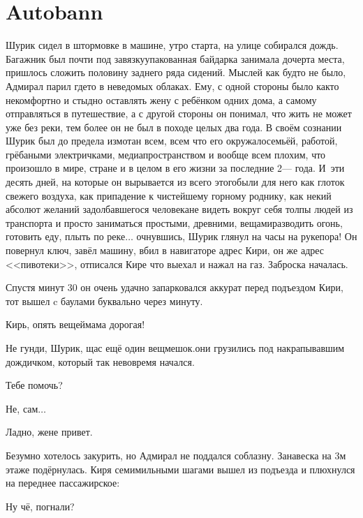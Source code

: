 \chapter{Autobann}
\vepsianrose

Шурик сидел в штормовке в машине, утро старта, на улице собирался дождь. Багажник был почти под завязку\mdash упакованная байдарка занимала дочерта места, пришлось сложить половину заднего ряда сидений. Мыслей как будто не было, Адмирал парил где\sdash то в неведомых облаках. Ему, с одной стороны было как\sdash то некомфортно и стыдно оставлять жену с ребёнком одних дома, а самому отправляться в путешествие, а с другой стороны он понимал, что жить не может уже без реки, тем более он не был в походе целых два года. В своём сознании Шурик был до предела измотан всем, всем что его окружало\mdash семьёй, работой, грёбаными электричками, медиапространством и вообще всем плохим, что произошло в мире, стране и в целом в его жизни за последние 2\thinspace--- года. И~эти десять дней, на которые он вырывается из всего этого\mdash были для него как глоток свежего воздуха, как припадение к чистейшему горному роднику, как некий абсолют желаний задолбавшегося человека\mdash не видеть вокруг себя толпы людей из транспорта и просто заниматься простыми, древними, вещами\mdash разводить огонь, готовить еду, плыть по реке$\ldots$ очнувшись, Шурик глянул на часы на руке\mdash пора! Он повернул ключ, завёл машину, вбил в навигаторе адрес Кири, он же адрес <<пивотеки>>, отписался Кире что выехал и нажал на газ. Заброска началась.

Спустя минут 30 он очень удачно запарковался аккурат перед подъездом Кири, тот вышел c баулами буквально через минуту.

\diagdash Кирь, опять вещей\mdash мама дорогая!

\diagdash Не гунди, Шурик, щас ещё один вещмешок.\mdash они грузились под накрапывавшим дождичком, который так невовремя начался.

\diagdash Тебе помочь?

\diagdash Не, сам$\ldots$

\diagdash Ладно, жене привет.

Безумно хотелось закурить, но Адмирал не поддался соблазну. Занавеска на 3\sdash м этаже подёрнулась. Киря семимильными шагами вышел из подъезда и плюхнулся на переднее пассажирское:

\diagdash Ну чё, погнали?

